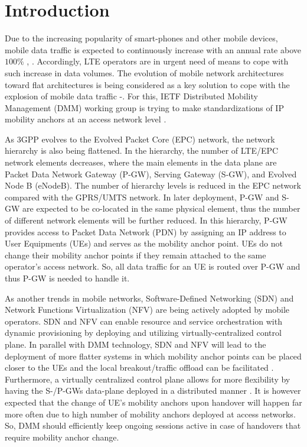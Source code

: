\documentclass[runningheads,a4paper]{llncs}
\begin{document}
\section{Introduction}
Due to the increasing popularity of smart-phones and other mobile devices, mobile data traffic is expected to continuously increase with an annual rate above $100\%$ \cite{ref1}, \cite{ref2}. Accordingly, LTE operators are in urgent need of means to cope with such increase in data volumes. The evolution of mobile network architectures toward flat architectures is being considered as a key solution to cope with the explosion of mobile data traffic \cite{ref3}-\cite{ref5}. For this, IETF Distributed Mobility Management (DMM) working group is trying to make standardizations of IP mobility anchors at an access network level \cite{ref6,ref7}. 

As 3GPP evolves to the Evolved Packet Core (EPC) network, the network hierarchy is also being flattened. In the hierarchy, the number of LTE/EPC network elements decreases, where the main elements in the data plane are Packet Data Network Gateway (P-GW), Serving Gateway (S-GW), and Evolved Node B (eNodeB). The number of hierarchy levels is reduced in the EPC network compared with the GPRS/UMTS network. In later deployment, P-GW and S-GW are expected to be co-located in the same physical element, thus the number of different network elements will be further reduced. In this hierarchy, P-GW provides access to Packet Data Network (PDN) by assigning an IP address to User Equipments (UEs) and serves as the mobility anchor point. UEs do not change their mobility anchor points if they remain attached to the same operator's access network. So, all data traffic for an UE is routed over P-GW and thus P-GW is needed to handle it.

As another trends in mobile networks, Software-Defined Networking (SDN) and Network Functions Virtualization (NFV) are being actively adopted by mobile operators. SDN and NFV can enable resource and service orchestration with dynamic provisioning by deploying and utilizing virtually-centralized control plane. In parallel with DMM technology, SDN and NFV will lead to the deployment of more flatter systems in which mobility anchor points can be placed closer to the UEs and the local breakout/traffic offload can be facilitated \cite{ref8}. Furthermore, a virtually centralized control plane allows for more flexibility by having the S-/P-GWs data-plane deployed in a distributed manner \cite{ref8-1}. It is however expected that the change of UE's mobility anchors upon handover will happen far more often due to high number of mobility anchors deployed at access networks. So, DMM should efficiently keep ongoing sessions active in case of handovers that require mobility anchor change. 
\end{document}
